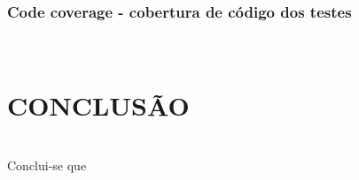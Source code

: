 \documentclass[times, twoside, watermark]{artigo}
\begin{document}
\subsubsection{Code coverage - cobertura de código dos testes}\hfill\\



\section{CONCLUSÃO}\hfill\\
Conclui-se que



\end{document}
